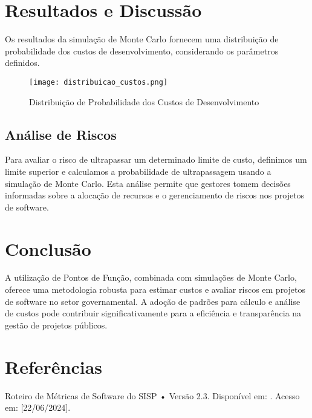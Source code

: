 \documentclass[12pt]{article}
\begin{document}
\section{Resultados e Discussão}

Os resultados da simulação de Monte Carlo fornecem uma distribuição de probabilidade dos custos de desenvolvimento, considerando os parâmetros definidos.

\begin{figure}[H]
\centering
\texttt{[image: distribuicao\_custos.png]}
\caption{Distribuição de Probabilidade dos Custos de Desenvolvimento}
\label{fig:distribuicao_custos}
\end{figure}

\subsection{Análise de Riscos}

Para avaliar o risco de ultrapassar um determinado limite de custo, definimos um limite superior e calculamos a probabilidade de ultrapassagem usando a simulação de Monte Carlo. Esta análise permite que gestores tomem decisões informadas sobre a alocação de recursos e o gerenciamento de riscos nos projetos de software.

\section{Conclusão}

A utilização de Pontos de Função, combinada com simulações de Monte Carlo, oferece uma metodologia robusta para estimar custos e avaliar riscos em projetos de software no setor governamental. A adoção de padrões para cálculo e análise de custos pode contribuir significativamente para a eficiência e transparência na gestão de projetos públicos.

\section{Referências}

\begin{thebibliography}{9}
Roteiro de Métricas de Software do SISP • Versão 2.3. Disponível em: . Acesso em: [22/06/2024].
\end{thebibliography}
\end{document}
